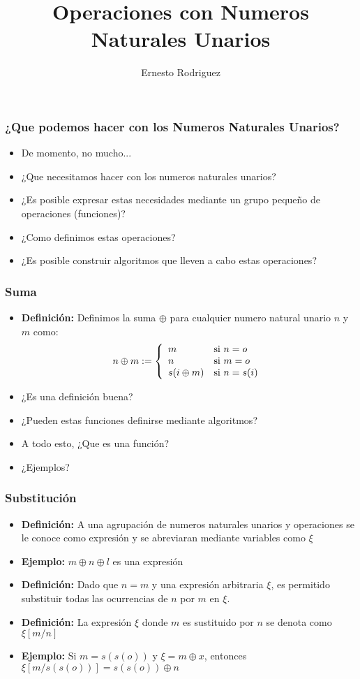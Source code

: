 \documentclass{beamer}
\title[Operaciones]{Operaciones con Numeros Naturales Unarios}
\author{Ernesto Rodriguez}
\institute{
    Universidad del Itsmo \\
    \medskip \textit{erodriguez@unis.edu.gt}
}
\date[\today]{}
\begin{document}
\begin{frame}
\titlepage
\end{frame}

\begin{frame}
    \frametitle{¿Que podemos hacer con los Numeros Naturales Unarios?}
    \begin{itemize}
        \item{De momento, no mucho...}
        \item{¿Que necesitamos hacer con los numeros naturales unarios?}
        \item{¿Es posible expresar estas necesidades mediante un grupo
        peque\~no de operaciones (funciones)?}
        \item{¿Como definimos estas operaciones?}
        \item{¿Es posible construir algoritmos que lleven a cabo estas operaciones?}
    \end{itemize}
\end{frame}

\begin{frame}
\frametitle{Suma}
\begin{itemize}
    \item{{\bf Definici\'on: }Definimos la suma $\oplus$ para cualquier numero
    natural unario $n$ y $m$ como:
    \[
        n\oplus m := \left\{
        \begin{array}{l l}
            m & \mbox{si } n=o \\
            n & \mbox{si } m=o \\
            s(i\oplus m) & \mbox{si } n=s(i) \\
        \end{array}
        \right.
    \]
    }
    \item{¿Es una definici\'on buena?}
    \item{¿Pueden estas funciones definirse mediante algoritmos?}
    \item{A todo esto, ¿Que es una funci\'on?}
    \item{¿Ejemplos?}
\end{itemize}
\end{frame}

\begin{frame}
\frametitle{Substituci\'on}
\begin{itemize}
    \item{{\bf Definici\'on: }A una agrupaci\'on de numeros naturales unarios y
    operaciones se le conoce como expresi\'on y se abreviaran mediante variables como $\xi$}
    \item{{\bf Ejemplo: }$m\oplus n \oplus l$ es una expresi\'on}
    \item{{\bf Definici\'on: }Dado que $n=m$ y una expresi\'on arbitraria $\xi$,
    es permitido substituir todas las ocurrencias de $n$ por $m$ en $\xi$.}
    \item{{\bf Definici\'on: }La expresi\'on $\xi$ donde $m$ es sustituido por $n$
    se denota como $\xi[m \slash n]$}
    \item{{\bf Ejemplo: }Si $m=s(s(o))$ y $\xi=m\oplus x$, entonces $\xi[m \slash s(s(o))]=s(s(o))\oplus n$}
\end{itemize}
\end{frame}
\end{document}
